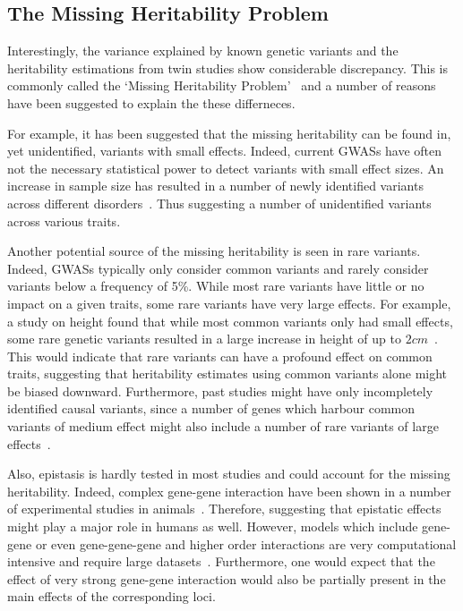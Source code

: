 \subsection{The Missing Heritability Problem}
\label{sub:missing_heritability}

Interestingly, the variance explained by known genetic variants and the heritability estimations from twin studies show considerable discrepancy.
This is commonly called the `Missing Heritability Problem'~\cite{Vineis2010} and a  number of reasons have been suggested to explain the these differneces.

For example, it has been suggested that the missing heritability can be found in, yet unidentified, variants with small effects.
Indeed, current GWASs have often not the necessary statistical power to detect variants with small effect sizes.
An increase in sample size has resulted in a number of newly identified variants across different disorders~\cite{Kathiresan2009,Ahmed2009,Zeggini2008,Manolio2009}.
Thus suggesting a number of unidentified variants across various traits.

Another potential source of the missing heritability is seen in rare variants.
Indeed, GWASs typically only consider common variants and rarely consider variants below a frequency of 5\%.
While most rare variants have little or no impact on a given traits, some rare variants have very large effects.
For example, a study on height found that while most common variants only had small effects, some rare genetic variants resulted in a large increase in height of up to $2cm$~\cite{Marouli2017}.
This would indicate that rare variants can have a profound effect on common traits, suggesting that heritability estimates using common variants alone might be biased downward.
Furthermore, past studies might have only incompletely identified causal variants, since a number of genes which harbour common variants of medium effect might also include a number of rare variants of large effects~\cite{Manolio2009}. 

Also, epistasis is hardly tested in most studies and could account for the missing heritability.
Indeed, complex gene-gene interaction have been shown in a number of experimental studies in  animals~\cite{Zuk24012012}.
Therefore, suggesting that epistatic effects might play a major role in humans as well.
However, models which include gene-gene or even gene-gene-gene and higher order interactions are very computational intensive and require large datasets~\cite{Lippert2013}.
Furthermore, one would expect that the effect of very strong gene-gene interaction would also be partially present in the main effects of the corresponding loci.

